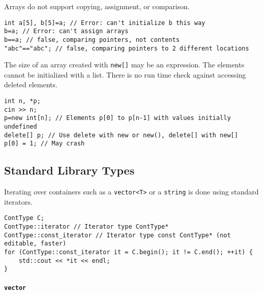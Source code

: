 			\columnbreak
			Arrays do not support copying, assignment, or comparison.
			\begin{code}\begin{lstlisting}[style=list]
int a[5], b[5]=a; // Error: can't initialize b this way
b=a; // Error: can't assign arrays
b==a; // false, comparing pointers, not contents
"abc"=="abc"; // false, comparing pointers to 2 different locations
			\end{lstlisting}\end{code}

			The size of an array created with \lstinline!new[]! may be an expression. The elements cannot be initialized with a list. There is no run time check against accessing deleted elements.
			\begin{code}\begin{lstlisting}[style=list]
int n, *p;
cin >> n;
p=new int[n]; // Elements p[0] to p[n-1] with values initially undefined
delete[] p; // Use delete with new or new(), delete[] with new[]
p[0] = 1; // May crash
			\end{lstlisting}\end{code}
			
		
	
	\subsection{Standard Library Types} %
		
		Iterating over containers such as a \lstinline!vector<T>! or a \lstinline!string! is done using standard iterators.
		\begin{code}\begin{lstlisting}[style=list]
ContType C;
ContType::iterator // Iterator type ContType*
ContType::const_iterator // Iterator type const ContType* (not editable, faster)
for (ContType::const_iterator it = C.begin(); it != C.end(); ++it) {
	std::cout << *it << endl;
}
		\end{lstlisting}\end{code}
		
		\newpage
		
		\paragraph{\lstinline!vector!} %
			
